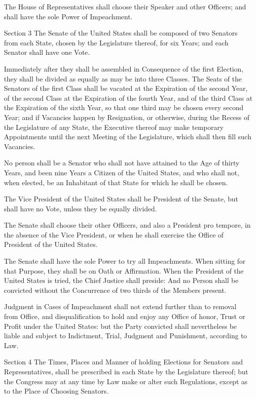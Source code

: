 \documentclass[12pt,a4paper]{article}
\begin{document}
The House of Representatives shall choose their Speaker and other Officers; and
shall have the sole Power of Impeachment.

Section 3
The Senate of the United States shall be composed of two Senators from each
State, chosen by the Legislature thereof, for six Years; and each Senator shall
have one Vote.

Immediately after they shall be assembled in Consequence of the first Election,
they shall be divided as equally as may be into three Classes. The Seats of the
Senators of the first Class shall be vacated at the Expiration of the second
Year, of the second Class at the Expiration of the fourth Year, and of the
third Class at the Expiration of the sixth Year, so that one third may be
chosen every second Year; and if Vacancies happen by Resignation, or otherwise,
during the Recess of the Legislature of any State, the Executive thereof may
make temporary Appointments until the next Meeting of the Legislature, which
shall then fill such Vacancies.

No person shall be a Senator who shall not have attained to the Age of thirty
Years, and been nine Years a Citizen of the United States, and who shall not,
when elected, be an Inhabitant of that State for which he shall be chosen.

The Vice President of the United States shall be President of the Senate, but
shall have no Vote, unless they be equally divided.

The Senate shall choose their other Officers, and also a President pro tempore,
in the absence of the Vice President, or when he shall exercise the Office of
President of the United States.

The Senate shall have the sole Power to try all Impeachments. When sitting for
that Purpose, they shall be on Oath or Affirmation. When the President of the
United States is tried, the Chief Justice shall preside: And no Person shall be
convicted without the Concurrence of two thirds of the Members present.

Judgment in Cases of Impeachment shall not extend further than to removal from
Office, and disqualification to hold and enjoy any Office of honor, Trust or
Profit under the United States: but the Party convicted shall nevertheless be
liable and subject to Indictment, Trial, Judgment and Punishment, according to
Law.

Section 4
The Times, Places and Manner of holding Elections for Senators and
Representatives, shall be prescribed in each State by the Legislature thereof;
but the Congress may at any time by Law make or alter such Regulations, except
as to the Place of Choosing Senators.
\end{document}
